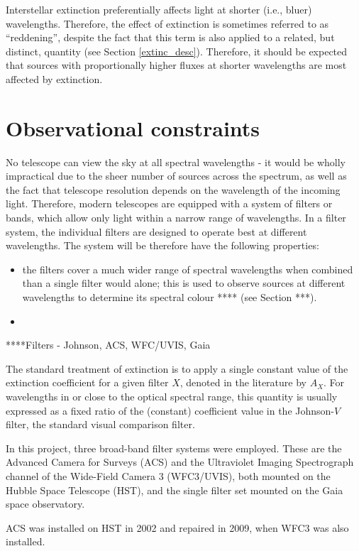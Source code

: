 \documentclass[12pt, a4paper]{report}
\begin{document}
Interstellar extinction preferentially affects light at shorter (i.e., bluer) wavelengths. Therefore, the effect of extinction is sometimes referred to as ``reddening'', despite the fact that this term is also applied to a related, but distinct, quantity (see Section \ref{extinc_desc}). Therefore, it should be expected that sources with proportionally higher fluxes at shorter wavelengths are most affected by extinction.

\section{Observational constraints}
No telescope can view the sky at all spectral wavelengths - it would be wholly impractical due to the sheer number of sources across the spectrum, as well as the fact that telescope resolution depends on the wavelength of the incoming light. Therefore, modern telescopes are equipped with a system of filters or bands, which allow only light within a narrow range of wavelengths. In a filter system, the individual filters are designed to operate best at different wavelengths. The system will be therefore have the following properties:

\begin{itemize}
\item the filters cover a much wider range of spectral wavelengths when combined than a single filter would alone; this is used to observe sources at different wavelengths to determine its spectral colour **** (see Section ***).
\item 
\end{itemize}

****Filters - Johnson, ACS, WFC/UVIS, Gaia

The standard treatment of extinction is to apply a single constant value of the extinction coefficient for a given filter $X$, denoted in the literature by $A_{X}$. For wavelengths in or close to the optical spectral range, this quantity is usually expressed as a fixed ratio of the (constant) coefficient value in the Johnson-$V$ filter, the standard visual comparison filter.

In this project, three broad-band filter systems were employed. These are the Advanced Camera for Surveys (ACS) and the Ultraviolet Imaging Spectrograph channel of the Wide-Field Camera 3 (WFC3/UVIS), both mounted on the Hubble Space Telescope (HST), and the single filter set mounted on the Gaia space observatory.

ACS was installed on HST in 2002 and repaired in 2009, when WFC3 was also installed.
\end{document}

